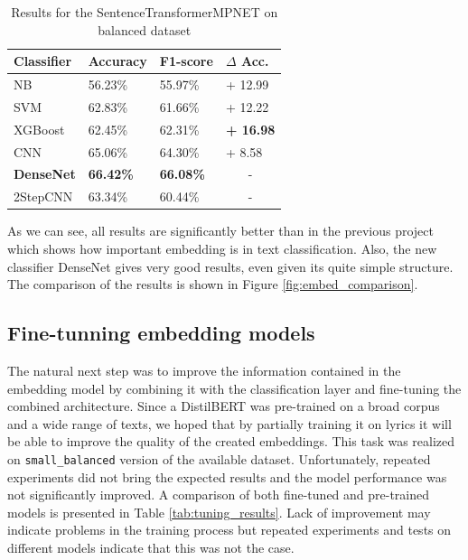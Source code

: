 \begin{table}[!h]
\centering
\begin{tabular}{l|l|l|l}
\textbf{Classifier} & \textbf{Accuracy} & \textbf{F1-score} & \textbf{$\Delta$ Acc.}  \\ \hline
NB         & 56.23\%           & 55.97\%           & + 12.99               \\
SVM          & 62.83\%           & 61.66\%           & + 12.22               \\
XGBoost             & 62.45\%           & 62.31\%           & \textbf{+ 16.98}      \\
CNN                 & 65.06\%           & 64.30\%           & + 8.58                \\
\textbf{DenseNet}   & \textbf{66.42\%}  & \textbf{66.08\%}  & \multicolumn{1}{c}{-} \\
2StepCNN            & 63.34\%           & 60.44\%           & \multicolumn{1}{c}{-}
\end{tabular}
\caption{Results for the SentenceTransformerMPNET on balanced dataset}
\label{tab:mpnet_results}
\end{table}

As we can see, all results are significantly better than in the previous project which shows how important embedding is in text classification. Also, the new classifier DenseNet gives very good results, even given its quite simple structure. The comparison of the results is shown in Figure \ref{fig:embed_comparison}.

\subsection{Fine-tunning embedding models}
The natural next step was to improve the information contained in the embedding model by combining it with the classification layer and fine-tuning the combined architecture. Since a DistilBERT was pre-trained on a broad corpus and a wide range of texts, we hoped that by partially training it on lyrics it will be able to improve the quality of the created embeddings.  This task was realized on \texttt{small\_balanced} version of the available dataset. Unfortunately, repeated experiments did not bring the expected results and the model performance was not significantly improved. A comparison of both fine-tuned  and pre-trained models is presented in Table \ref{tab:tuning_results}. Lack of improvement may indicate problems in the training process but repeated experiments and tests on different models indicate that this was not the case. 


